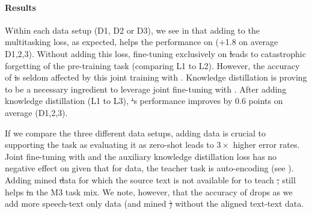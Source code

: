 \paragraph{Results}
Within each data setup (D1, D2 or D3), we see in  that adding \mt to the multitasking loss, as expected, helps the performance on \mt (+1.8 \bleu on average D1,2,3). Without adding this loss, fine-tuning exclusively on \st leads to catastrophic forgetting of the pre-training \mt task (comparing L1 to L2). However, the accuracy of \st is seldom affected by this joint training with \mt. Knowledge distillation is proving to be a necessary ingredient to leverage joint fine-tuning with \mt. After adding knowledge distillation (L1 to L3), \st's performance improves by 0.6 \bleu points on average (D1,2,3).

If we compare the three different data setups, adding \asr data is crucial to supporting the \asr task as evaluating it as zero-shot leads to $3\times$ higher error rates. Joint fine-tuning with \mt and the auxiliary knowledge distillation loss has no negative effect on \asr given that for \asr data, the teacher task is auto-encoding (see ). Adding mined \st data for which the source text is not available for \mt to teach \st, still helps \st in the M3 task mix.
We note, however, that the accuracy of \mt drops as we add more speech-text only data (\asr and mined \st) without the aligned text-text data.

